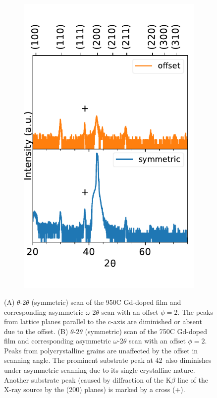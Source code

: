 \begin{figure}
\begin{subfigure}[t]{.45\linewidth}
        \includegraphics[width=\linewidth]{Figures/180316-film-750-2thetaOmegaOffset.pdf}
        \caption{}
        \label{fig:films:xrd:2thetaOmega:offset:750}
    \end{subfigure}
    \caption{(A) $\theta$-2$\theta$ (symmetric) scan of the 950\textdegree C Gd-doped film and corresponding asymmetric $\omega$-2$\theta$ scan with an offset $\phi =  2$\textdegree. The peaks from lattice planes parallel to the c-axis are diminished or absent due to the offset. (B) $\theta$-2$\theta$ (symmetric) scan of the 750\textdegree C Gd-doped film and corresponding asymmetric $\omega$-2$\theta$ scan with an offset $\phi =  2$\textdegree. Peaks from polycrystalline grains are unaffected by the offset in scanning angle. The prominent substrate peak at 42\textdegree\ also diminishes under asymmetric scanning due to its single crystalline nature.  Another substrate peak (caused by diffraction of the K$\beta$ line of the X-ray source by the (200) planes) is marked by a cross (+).}
    \label{fig:films:xrd:2thetaOmega:offset}
\end{figure}
